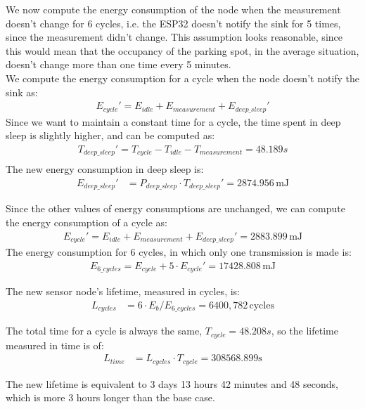 We now compute the energy consumption of the node when the measurement doesn't change for 6 cycles, i.e. the ESP32 doesn't notify the sink for 5 times, since the measurement didn't change. This assumption looks reasonable, since this would mean that the occupancy of the parking spot, in the average situation, doesn't change more than one time every 5 minutes.\\
We compute the energy consumption for a cycle when the node doesn't notify the sink as:
\begin{align*}
E_{cycle}' = E_{idle} + E_{measurement} + E_{deep\_sleep}'
\end{align*}
Since we want to maintain a constant time for a cycle, the time spent in deep sleep is slightly higher, and can be computed as:
\begin{align*}
	T_{deep\_sleep}' = T_{cycle} - T_{idle} - T_{measurement} = 48.189 s\\
\end{align*}
The new energy consumption in deep sleep is:
\begin{align*}
	E_{deep\_sleep}' &= P_{deep\_sleep} \cdot T_{deep\_sleep}' = 2874.956\,\text{mJ} 
\end{align*}

Since the other values of energy consumptions are unchanged, we can compute the energy consumption of a cycle as:
\begin{align*}
	E_{cycle}' = E_{idle} + E_{measurement} + E_{deep\_sleep}' = 2883.899\,\text{mJ} 
\end{align*}
The energy consumption for 6 cycles, in which only one transmission is made is:
\begin{align*}
	E_{6\_cycles} = E_{cycle} + 5 \cdot E_{cycle}' = 17428.808\,\text{mJ} 
\end{align*}

The new sensor node's lifetime, measured in cycles, is:
\begin{align*}
	L_{cycles}&= 6 \cdot E_{b} / E_{6\_cycles} = 6400,782 \,\text{cycles} 
\end{align*}

The total time for a cycle is always the same, $T_{cycle} = 48.208 s$, so the lifetime measured in time is of:
\begin{align*}
	L_{time}&= L_{cycles} \cdot T_{cycle} = 308568.899 \text{s}
\end{align*}

The new lifetime is equivalent to 3 days 13 hours 42 minutes and 48 seconds, which is more 3 hours longer than the base case.

